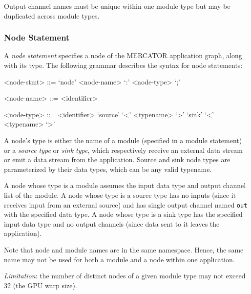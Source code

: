 \documentclass[11pt]{article}
\begin{document}
Output channel names must be unique within one module type but may be
duplicated across module types.


\subsubsection{Node Statement}

A \textit{node statement} specifies a node of the MERCATOR application
graph, along with its type.  The following grammar describes the
syntax for node statements:
\begin{grammar}

<node-stmt> ::= `node' <node-name> `:' <node-type> `;'

<node-name> ::= <identifier>

<node-type> ::= <identifier>
\alt `source' `<' <typename> `>'
\alt `sink'   `<' <typename> `>'

\end{grammar}

A node's type is either the name of a module (specified in a
module statement) or a \emph{source type} or \emph{sink type}, which
respectively receive an external data stream or emit a data stream
from the application.  Source and sink node types are parameterized by
their data types, which can be any valid typename.

A node whose type is a module assumes the input data type and output
channel list of the module.  A node whose type is a source type has no
inputs (since it receives input from an external source) and has
single output channel named \texttt{out} with the specified data type.
A node whose type is a sink type has the specified input data type and
no output channels (since data sent to it leaves the application).

Note that node and module names are in the same namespace. Hence, the
same name may not be used for both a module and a node within one
application.

\textit{Limitation}: the number of distinct nodes of a given module
type may not exceed 32 (the GPU warp size).

\end{document}
